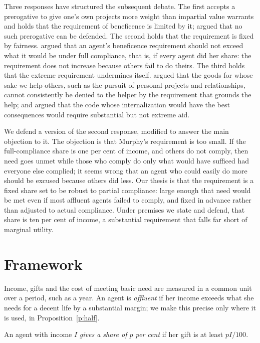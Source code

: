 \documentclass{situationist-preprint}
\begin{document}
Three responses have structured the subsequent debate. The first accepts a prerogative to give one's own projects more weight than impartial value warrants \citep{Scheffler1982} and holds that the requirement of beneficence is limited by it; \citet{Kagan1989} argued that no such prerogative can be defended. The second holds that the requirement is fixed by fairness. \citet{Murphy1993,Murphy2000} argued that an agent's beneficence requirement should not exceed what it would be under full compliance, that is, if every agent did her share: the requirement does not increase because others fail to do theirs. The third holds that the extreme requirement undermines itself. \citet{Cullity2004} argued that the goods for whose sake we help others, such as the pursuit of personal projects and relationships, cannot consistently be denied to the helper by the requirement that grounds the help; and \citet{Hooker2000} argued that the code whose internalization would have the best consequences would require substantial but not extreme aid.

We defend a version of the second response, modified to answer the main objection to it. The objection is that Murphy's requirement is too small. If the full-compliance share is one per cent of income, and others do not comply, then need goes unmet while those who comply do only what would have sufficed had everyone else complied; it seems wrong that an agent who could easily do more should be excused because others did less. Our thesis is that the requirement is a fixed share set to be robust to partial compliance: large enough that need would be met even if most affluent agents failed to comply, and fixed in advance rather than adjusted to actual compliance. Under premises we state and defend, that share is ten per cent of income, a substantial requirement that falls far short of marginal utility.

\section{Framework}

Income, gifts and the cost of meeting basic need are measured in a common unit over a period, such as a year. An agent is \emph{affluent} if her income exceeds what she needs for a decent life by a substantial margin; we make this precise only where it is used, in Proposition~\ref{p:half}.

\begin{definition}\label{d:share}
An agent with income $I$ \emph{gives a share of $p$ per cent} if her gift is at least $pI/100$.
\end{definition}
\end{document}
